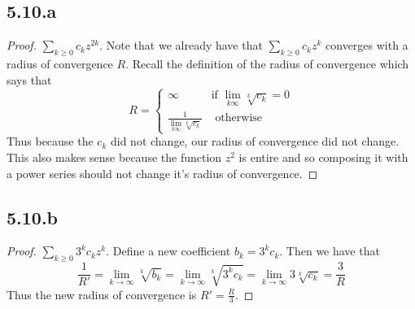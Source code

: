 \documentclass[a4paper, 11pt]{article}
\begin{document}
	
	
	
\subsection*{5.10.a}
	\begin{proof}
		$\sum_{k\geq 0} c_k z^{2k}$. Note that we already have that $\sum_{k\geq 0}c_kz^k$ converges with a radius of convergence $R$. Recall the definition of the radius of convergence which says that 
			\begin{equation}
				R = \begin{cases}
						\infty & \text{if } \lim\limits_{k\infty} \sqrt[k]{c_k} = 0 \\ 
						\frac{1}{\lim\limits_{k\infty} \sqrt[k]{c_k}} & \text{ otherwise} 
					\end{cases}
			\end{equation}
		Thus because the $c_k$ did not change, our radius of convergence did not change. This also makes sense because the function $z^2$ is entire and so composing it with a power series should not change it's radius of convergence. 
	\end{proof}
	
\subsection*{5.10.b} 
	\begin{proof}
		$\sum_{k\geq 0} 3^k c_k z^k$. Define a new coefficient $b_k = 3^k c_k$. Then we have that 
			\begin{equation*}
				\frac{1}{R'} = \lim\limits_{k\to\infty}\sqrt[k]{b_k} = \lim\limits_{k\to\infty}\sqrt[k]{3^k c_k}=\lim\limits_{k\to\infty}3\sqrt[k]{c_k} = \frac{3}{R}
			\end{equation*}
		Thus the new radius of convergence is $R' = \frac{R}{3}$. 
	\end{proof}
	
	
	
	
	
	
	
	
	
	
	
	
	
	
	
	
	
	
	
	
	
	
	
	
	
	
	
	
	
	
	
	
\end{document}
